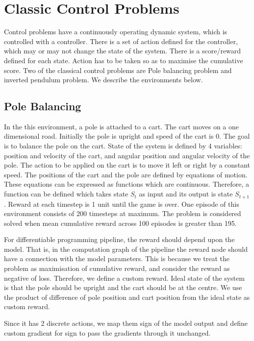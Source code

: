\documentclass{juliacon}
\begin{document}
\section{Classic Control Problems}
\label{sec:ccprobs}
Control problems have a continuously operating dynamic system, which is controlled with a controller. There is a set of action defined for the controller, which may or may not change the state of the system. There is a score/reward defined for each state. Action has to be taken so as to maximise the cumulative score. Two of the classical control problems are Pole balancing problem and inverted pendulum problem. We describe the environments below.

\subsection{Pole Balancing}
\label{sec:cartpole}
In the this environment, a pole is attached to a cart. The cart moves on a one dimensional road. Initially the pole is upright and speed of the cart is 0. The goal is to balance the pole on the cart. State of the system is defined by 4 variables: position and velocity of the cart, and angular position and angular velocity of the pole. The action to be applied on the cart is to move it left or right by a constant speed. The positions of the cart and the pole are defined by equations of motion. These equations can be expressed as functions which are continuous. Therefore, a function can be defined which takes state $S_t$ as input and its output is state $S_{t+1}$. Reward at each timestep is 1 unit until the game is over. One episode of this environment consists of 200 timesteps at maximum. The problem is considered solved when mean cumulative reward across 100 episodes is greater than 195.\cite{Barto:1990:NAE:104134.104143, 1606.01540}

For differentiable programming pipeline, the reward should depend upon the model. That is, in the computation graph of the pipeline the reward node should have a connection with the model parameters. This is because we treat the problem as maximisation of cumulative reward, and consider the reward as negative of loss. Therefore, we define a custom reward. Ideal state of the system is that the pole should be upright and the cart should be at the centre. We use the product of difference of pole position and cart position from the ideal state as custom reward.

Since it has 2 discrete actions, we map them sign of the model output and define custom gradient for sign to pass the gradients through it unchanged.
\end{document}

